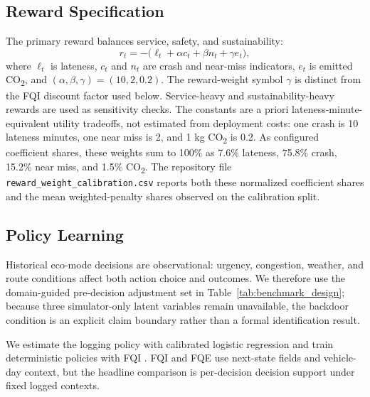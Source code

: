\documentclass[a4paper,conference]{IEEEtran}
\begin{document}
\subsection{Reward Specification}
The primary reward balances service, safety, and sustainability:
\begin{equation}
r_t = -\big( \ell_t + \alpha c_t + \beta n_t + \gamma e_t \big),
\label{eq:primary_reward}
\end{equation}
where $\ell_t$ is lateness, $c_t$ and $n_t$ are crash and near-miss indicators, $e_t$ is emitted CO\textsubscript{2}, and $(\alpha,\beta,\gamma)=(10,2,0.2)$. The reward-weight symbol $\gamma$ is distinct from the FQI discount factor used below. Service-heavy and sustainability-heavy rewards are used as sensitivity checks.
The constants are a priori lateness-minute-equivalent utility tradeoffs, not estimated from deployment costs: one crash is 10 lateness minutes, one near miss is 2, and 1 kg CO\textsubscript{2} is 0.2. As configured coefficient shares, these weights sum to 100\% as 7.6\% lateness, 75.8\% crash, 15.2\% near miss, and 1.5\% CO\textsubscript{2}. The repository file \texttt{reward\_weight\_calibration.csv} reports both these normalized coefficient shares and the mean weighted-penalty shares observed on the calibration split.

\subsection{Policy Learning}
Historical eco-mode decisions are observational: urgency, congestion, weather, and route conditions affect both action choice and outcomes. We therefore use the domain-guided pre-decision adjustment set in Table~\ref{tab:benchmark_design}; because three simulator-only latent variables remain unavailable, the backdoor condition is an explicit claim boundary rather than a formal identification result.

We estimate the logging policy with calibrated logistic regression and train deterministic policies with FQI \cite{ernst2005tree}. FQI and FQE use next-state fields and vehicle-day context, but the headline comparison is per-decision decision support under fixed logged contexts.
\end{document}
